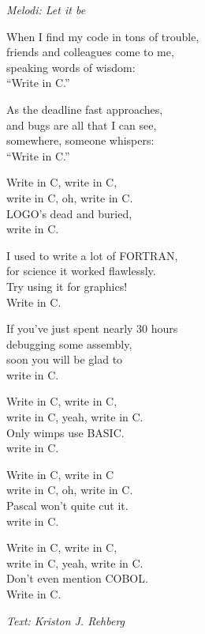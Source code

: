 {\footnotesize\textit{Melodi: Let it be}}\par
\vspace{10pt}
When I find my code in tons of trouble,\\
friends and colleagues come to me,\\
speaking words of wisdom:\\
``Write in C.''\par
\vspace{10pt}
As the deadline fast approaches,\\
and bugs are all that I can see,\\
somewhere, someone whispers:\\
``Write in C.''\par
\vspace{10pt}
Write in C, write in C,\\
write in C, oh, write in C.\\
LOGO's dead and buried,\\
write in C.\par
\vspace{10pt}
I used to write a lot of FORTRAN,\\
for science it worked flawlessly.\\
Try using it for graphics!\\
Write in C.\par
\vspace{10pt}
If you've just spent nearly 30 hours\\
debugging some assembly,\\
soon you will be glad to\\
write in C.\par
\newpage
Write in C, write in C,\\
write in C, yeah, write in C.\\
Only wimps use BASIC.\\
write in C.\par
\vspace{10pt}
Write in C, write in C \\
write in C, oh, write in C.\\
Pascal won't quite cut it.\\
write in C.\par
\vspace{10pt}
Write in C, write in C,\\
write in C, yeah, write in C.\\
Don't even mention COBOL.\\
Write in C.\par
\vspace{10pt}
{\footnotesize\textit{Text: Kriston J. Rehberg}}
